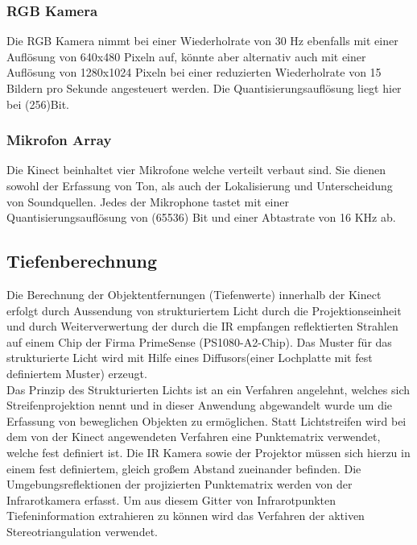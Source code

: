 \documentclass[appendixprefix,a4paper,bibliography=totoc,twoside=true,11pt,DIV=11,BCOR=6mm,headsepline,pointlessnumbers]{scrbook}
\begin{document}
\subsubsection{RGB Kamera}

Die RGB Kamera nimmt bei einer Wiederholrate von 30 Hz ebenfalls mit einer Auflösung von 640x480 Pixeln auf, könnte aber alternativ auch mit einer Auflösung von 1280x1024 Pixeln bei einer reduzierten Wiederholrate von 15 Bildern pro Sekunde angesteuert werden.
Die Quantisierungsauflösung liegt hier bei  (256)Bit. \\


\subsubsection{Mikrofon Array}
Die Kinect beinhaltet vier Mikrofone welche verteilt verbaut sind. Sie dienen sowohl der Erfassung von Ton, als auch der Lokalisierung und Unterscheidung von Soundquellen. Jedes der Mikrophone tastet mit einer Quantisierungsauflösung von  (65536) Bit und einer Abtastrate von 16 KHz ab.

\subsection{Tiefenberechnung}

Die Berechnung der Objektentfernungen (Tiefenwerte) innerhalb der Kinect erfolgt durch Aussendung von strukturiertem Licht durch die Projektionseinheit und durch Weiterverwertung  der durch die IR empfangen reflektierten Strahlen auf einem Chip der Firma PrimeSense (PS1080-A2-Chip). Das Muster für das strukturierte Licht wird mit Hilfe eines Diffusors(einer Lochplatte mit fest definiertem Muster) erzeugt.\\
Das Prinzip des Strukturierten Lichts ist an ein Verfahren angelehnt, welches sich Streifenprojektion nennt und in dieser Anwendung abgewandelt wurde um die Erfassung von beweglichen Objekten zu ermöglichen. Statt Lichtstreifen wird bei dem von der Kinect angewendeten Verfahren eine Punktematrix verwendet, welche fest definiert ist. Die IR Kamera sowie der Projektor müssen sich hierzu in einem fest definiertem, gleich großem Abstand zueinander befinden.
Die Umgebungsreflektionen der projizierten Punktematrix werden von der Infrarotkamera erfasst.
Um aus diesem Gitter von Infrarotpunkten Tiefeninformation extrahieren zu können wird das Verfahren der aktiven Stereotriangulation verwendet.\\
\end{document}

